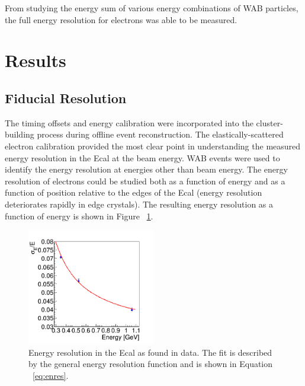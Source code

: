\documentclass[twoside]{article}
\begin{document}
\begin{multicols}{2}
From studying the energy sum of various energy combinations of WAB particles, the full energy resolution for electrons was able to be measured. 


\section{Results}
\subsection{Fiducial Resolution}
The timing offsets and energy calibration were incorporated into the cluster-building process during offline event reconstruction. The elastically-scattered electron calibration provided the most clear point in understanding the measured energy resolution in the Ecal at the beam energy. WAB events were used to identify the energy resolution at energies other than beam energy. The energy resolution of electrons could be studied both as a function of energy and as a function of position relative to the edges of the Ecal (energy resolution deteriorates rapidly in edge crystals). The resulting energy resolution as a function of energy is shown in Figure ~\ref{eres}. 
\begin{figure}[H]
  \centering
      \includegraphics[width=0.5\textwidth]{pics/resolution.png}
  \caption{Energy resolution in the Ecal as found in data. The fit is described by the general energy resolution function and is shown in Equation ~\ref{eq:enres}.}
  \label{eres}
\end{figure}


\end{multicols}
\end{document}
